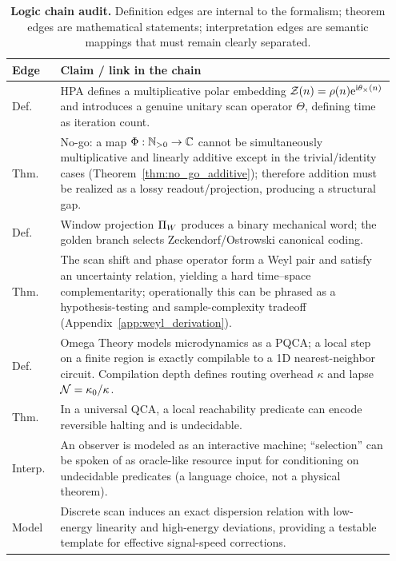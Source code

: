 \begin{table}[t]
\centering
\begin{tabular}{@{}p{0.12\linewidth}p{0.83\linewidth}@{}}
\toprule
\textbf{Edge} & \textbf{Claim / link in the chain} \\
\midrule
Def. & HPA defines a multiplicative polar embedding $\mathcal{Z}(n)=\rho(n)\mathrm{e}^{\mathrm{i}\theta_\times(n)}$ and introduces a genuine unitary scan operator $\Theta$, defining time as iteration count. \\
Thm. & No-go: a map $\Phi:\mathbb{N}_{>0}\to\mathbb{C}$ cannot be simultaneously multiplicative and linearly additive except in the trivial/identity cases (Theorem~\ref{thm:no_go_additive}); therefore addition must be realized as a lossy readout/projection, producing a structural gap. \\
Def. & Window projection $\Pi_W$ produces a binary mechanical word; the golden branch selects Zeckendorf/Ostrowski canonical coding. \\
Thm. & The scan shift and phase operator form a Weyl pair and satisfy an uncertainty relation, yielding a hard time--space complementarity; operationally this can be phrased as a hypothesis-testing and sample-complexity tradeoff (Appendix~\ref{app:weyl_derivation}). \\
Def. & Omega Theory models microdynamics as a PQCA; a local step on a finite region is exactly compilable to a 1D nearest-neighbor circuit. Compilation depth defines routing overhead $\kappa$ and lapse $\mathcal{N}=\kappa_0/\kappa$. \\
Thm. & In a universal QCA, a local reachability predicate can encode reversible halting and is undecidable. \\
Interp. & An observer is modeled as an interactive machine; ``selection'' can be spoken of as oracle-like resource input for conditioning on undecidable predicates (a language choice, not a physical theorem). \\
Model & Discrete scan induces an exact dispersion relation with low-energy linearity and high-energy deviations, providing a testable template for effective signal-speed corrections. \\
\bottomrule
\end{tabular}
\caption{\textbf{Logic chain audit.} Definition edges are internal to the formalism; theorem edges are mathematical statements; interpretation edges are semantic mappings that must remain clearly separated.}
\label{tab:logic_chain}
\end{table}
